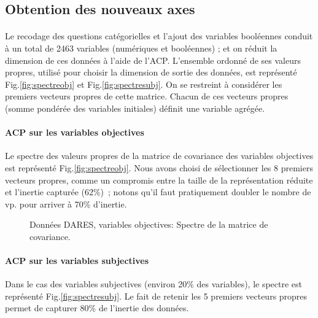 \documentclass[11pt,fleqn,openany,frenchb]{book} %
\begin{document}
\subsection{Obtention des nouveaux axes }
\paragraph{}
Le recodage des questions catégorielles et l'ajout des variables booléennes conduit à un total de 2463 variables (numériques et booléennes) ; et on réduit la dimension de ces données à l'aide de l'ACP. L'ensemble ordonné de ses valeurs propres, utilisé pour choisir la dimension de sortie des données, est représenté Fig.\ref{fig:spectreobj} et Fig.\ref{fig:spectresubj}. On se restreint à considérer les premiers vecteurs propres de cette matrice. Chacun de ces vecteurs propres (somme pondérée des variables initiales) définit une variable agrégée. 

\paragraph{ACP sur les variables objectives\\}
Le spectre des valeurs propres de la matrice de covariance des variables objectives est représenté Fig.\ref{fig:spectreobj}.  Nous avons choisi de sélectionner les 8 premiers vecteurs propres, comme un compromis entre la taille de la représentation réduite et l'inertie capturée (62\%)~; notons qu'il faut pratiquement doubler le nombre de vp. pour arriver à 70\% d'inertie. 

\begin{figure}[!h]
    \centering
  \hspace{2pt}
  \caption{Données DARES, variables objectives: Spectre de la matrice de covariance.}
\end{figure}
  

\paragraph{ACP sur les variables subjectives\\}
Dans le cas des variables subjectives (environ 20\% des variables), le spectre est représenté Fig.\ref{fig:spectresubj}. Le fait de retenir les 5 premiers vecteurs propres permet de capturer 80\% de l'inertie des données.
\end{document}

